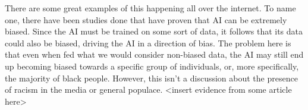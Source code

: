 There are some great examples of this happening all over the internet. To name one, there have
been studies done that have proven that AI can be extremely biased. Since the AI must be trained
on some sort of data, it follows that its data could also be biased, driving the AI in a direction
of bias. The problem here is that even when fed what we would consider non-biased data, the AI
may still end up becoming biased towards a specific group of individuals, or, more specifically,
the majority of black people. However, this isn't a discussion about the presence of racism in 
the media or general populace. <insert evidence from some article here>
